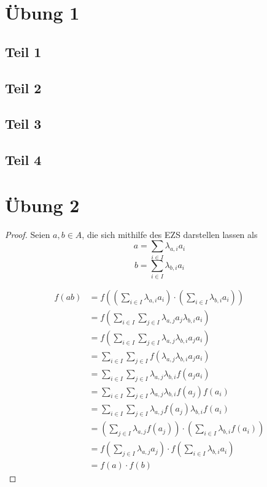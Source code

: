 \documentclass[10pt,a4paper]{article}
\begin{document}
\section*{Übung 1}

\subsection*{Teil 1}

\subsection*{Teil 2}

\subsection*{Teil 3}

\subsection*{Teil 4}

\section*{Übung 2}

\begin{proof}
Seien $a, b \in A$, die sich mithilfe des EZS darstellen lassen als
\begin{equation}
a = \sum_{i \in I} \lambda_{a, i} a_{i}
\end{equation}
\begin{equation}
b = \sum_{i \in I} \lambda_{b, i} a_{i}
\end{equation}

\begin{align*}
f(ab) & = f \left( \left( \sum_{i \in I} \lambda_{a, i} a_{i} \right) \cdot \left( \sum_{i \in I} \lambda_{b, i} a_{i} \right) \right)\\
& = f \left( \sum_{i \in I} \sum_{j \in I} \lambda_{a, j} a_{j} \lambda_{b, i} a_{i} \right)\\
& = f \left( \sum_{i \in I} \sum_{j \in I} \lambda_{a, j} \lambda_{b, i} a_{j} a_{i} \right)\\
& = \sum_{i \in I} \sum_{j \in I} f \left( \lambda_{a, j} \lambda_{b, i} a_{j} a_{i} \right)\\
& = \sum_{i \in I} \sum_{j \in I} \lambda_{a, j} \lambda_{b, i} f \left( a_{j} a_{i} \right)\\
& = \sum_{i \in I} \sum_{j \in I} \lambda_{a, j} \lambda_{b, i} f(a_{j}) f(a_{i})\\
& = \sum_{i \in I} \sum_{j \in I} \lambda_{a, j} f(a_{j}) \lambda_{b, i} f(a_{i})\\
& = \left( \sum_{j \in I} \lambda_{a, j} f(a_{j}) \right) \cdot \left( \sum_{i \in I} \lambda_{b, i} f(a_{i}) \right)\\
& = f \left( \sum_{j \in I} \lambda_{a, j} a_{j} \right) \cdot f \left( \sum_{i \in I} \lambda_{b, i} a_{i} \right)\\
& = f(a) \cdot f(b)
\end{align*}
\end{proof}
\end{document}
